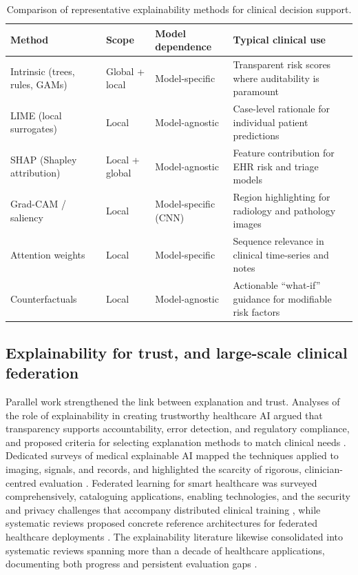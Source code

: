 \documentclass[11pt,a4paper]{article}
\begin{document}
\begin{table}[t]
  \centering
  \caption{Comparison of representative explainability methods for clinical
  decision support.}
  \label{tab:xai}
  \small
  \begin{tabularx}{\textwidth}{@{}l l l X@{}}
    \toprule
    \textbf{Method} & \textbf{Scope} & \textbf{Model dependence} & \textbf{Typical clinical use} \\
    \midrule
    Intrinsic (trees, rules, GAMs) & Global + local & Model-specific & Transparent risk scores where auditability is paramount \\
    LIME (local surrogates) & Local & Model-agnostic & Case-level rationale for individual patient predictions \\
    SHAP (Shapley attribution) & Local + global & Model-agnostic & Feature contribution for EHR risk and triage models \\
    Grad-CAM / saliency & Local & Model-specific (CNN) & Region highlighting for radiology and pathology images \\
    Attention weights & Local & Model-specific & Sequence relevance in clinical time-series and notes \\
    Counterfactuals & Local & Model-agnostic & Actionable ``what-if'' guidance for modifiable risk factors \\
    \bottomrule
  \end{tabularx}
\end{table}

\subsection{Explainability for trust, and large-scale clinical federation}
Parallel work strengthened the link between explanation and trust. Analyses of
the role of explainability in creating trustworthy healthcare AI argued that
transparency supports accountability, error detection, and regulatory
compliance, and proposed criteria for selecting explanation methods to match
clinical needs \cite{ref28}. Dedicated surveys of medical explainable AI mapped
the techniques applied to imaging, signals, and records, and highlighted the
scarcity of rigorous, clinician-centred evaluation \cite{ref29}. Federated
learning for smart healthcare was surveyed comprehensively, cataloguing
applications, enabling technologies, and the security and privacy challenges
that accompany distributed clinical training \cite{ref30}, while systematic
reviews proposed concrete reference architectures for federated healthcare
deployments \cite{ref31}. The explainability literature likewise consolidated
into systematic reviews spanning more than a decade of healthcare applications,
documenting both progress and persistent evaluation gaps \cite{ref32}.
\end{document}
